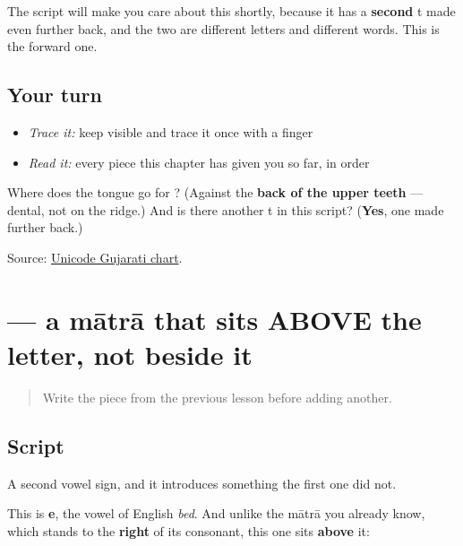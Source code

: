 The script will make you care about this shortly, because it has a \textbf{second} t made even further back, and the two are different letters and different words. This is the forward one.

\subsection*{Your turn}
\begin{itemize}
\raggedright
  \item \emph{Trace it:} keep  visible and trace it once with a finger
  \item \emph{Read it:} every piece this chapter has given you so far, in order
\end{itemize}

\begin{tcolorbox}[breakable,colback=teal!4,colframe=teal!35!black,title={Before you move on}]
Where does the tongue go for \textbf{}? (Against the \textbf{back of the upper teeth} — dental, not on the ridge.) And is there another t in this script? (\textbf{Yes}, one made further back.)

Source: \href{https://www.unicode.org/charts/PDF/U0A80.pdf}{Unicode Gujarati chart}.
\end{tcolorbox}
\section[\texorpdfstring{\gu{ે} (-e)}{ે (-e)}]{ — a mātrā that sits ABOVE the letter, not beside it}

\label{lesson:GU-W01-e-matra}



\begin{quote}
Write the piece from the previous lesson before adding another.
\end{quote}

\subsection*{Script}

A second vowel sign, and it introduces something the first one did not.

\begin{quote}
\end{quote}

This is \textbf{e}, the vowel of English \emph{bed}. And unlike the mātrā you already know, which stands to the \textbf{right} of its consonant, this one sits \textbf{above} it:

